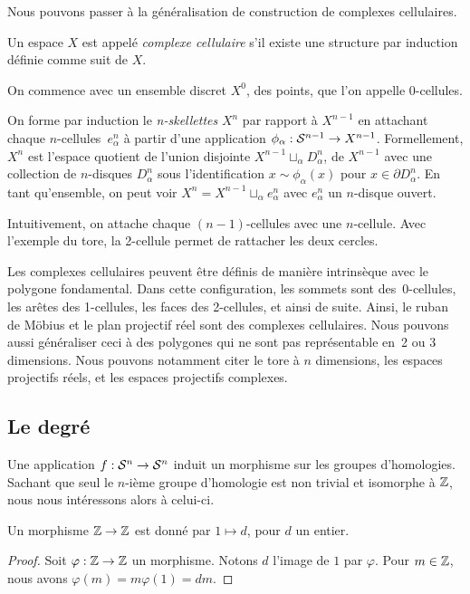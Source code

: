 Nous pouvons passer à la généralisation de construction de complexes cellulaires.

\begin{definition}
Un espace $X$ est appelé \emph{complexe cellulaire} s'il existe une structure par induction définie comme suit de $X$.

On commence avec un ensemble discret $X^0$, des points, que l'on appelle 0-cellules.

On forme par induction le \emph{n-skellettes} $X^n$ par rapport à $X^{n-1}$ en attachant chaque $n$-cellules~$e^n_\alpha$ à partir d'une application $\phi_\alpha:\mathcal{S}^{n-1}\to X^{n-1}$. Formellement, $X^n$ est l'espace quotient de l'union disjointe $X^{n-1}\sqcup_\alpha D^n_\alpha$, de $X^{n-1}$ avec une collection de $n$-disques $D^n_\alpha$ sous l'identification $x\sim \phi_\alpha(x)$ pour $x\in\partial D_\alpha^n$. En tant qu'ensemble, on peut voir $X^n=X^{n-1}\sqcup_\alpha e^n_\alpha$ avec $e_\alpha^n$ un $n$-disque ouvert.
\end{definition}

Intuitivement, on attache chaque $(n-1)$-cellules avec une $n$-cellule. Avec l'exemple du tore, la 2-cellule permet de rattacher les deux cercles.

\begin{exemple}
Les complexes cellulaires peuvent être définis de manière intrinsèque avec le polygone fondamental. Dans cette configuration, les sommets sont des~0-cellules, les arêtes des 1-cellules, les faces des 2-cellules, et ainsi de suite. Ainsi, le ruban de Möbius et le plan projectif réel sont des complexes cellulaires. Nous pouvons aussi généraliser ceci à des polygones qui ne sont pas représentable en~2 ou 3 dimensions. Nous pouvons notamment citer le tore à $n$ dimensions, les espaces projectifs réels, et les espaces projectifs complexes.
\end{exemple}

\subsection{Le degré}

Une application $f:\mathcal{S}^{n}\to \mathcal{S}^{n}$ induit un morphisme sur les groupes d'homologies. Sachant que seul le $n$-ième groupe d'homologie est non trivial et isomorphe à $\mathbb{Z}$, nous nous intéressons alors à celui-ci.

\begin{proposition}
Un morphisme $\mathbb{Z}\to\mathbb{Z}$ est donné par $1\mapsto d$, pour $d$ un entier.
\end{proposition}
\begin{proof}
Soit $\varphi:\mathbb{Z}\to\mathbb{Z}$ un morphisme. Notons $d$ l'image de $1$ par $\varphi$. Pour $m\in \mathbb{Z}$, nous avons $\varphi(m)=m\varphi(1)=dm$.
\end{proof}

